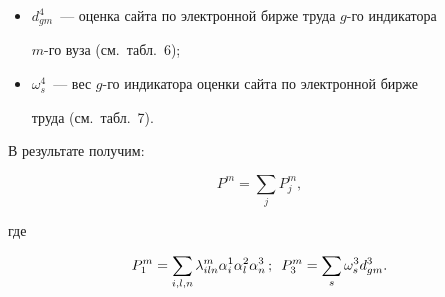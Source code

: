 \begin{itemize}
$\omega_s^3$~--- вес $s$-го индикатора оценки сайта по электронной торговой 


площадке (см.\ табл.~6); 


  \item


$d^4_{gm}$~--- оценка сайта по электронной бирже труда $g$-го индикатора 


$m$-го вуза (см.\ табл.~6); 


  \item


$\omega^4_s$~--- вес $g$-го индикатора оценки сайта по электронной бирже 


труда (см.\ табл.~7). 


  \end{itemize}





  В результате получим: 


  


  \vspace*{-2pt}


  


  \noindent


$$


P^m=\sum\limits_j P_j^m,


$$





\vspace*{-6pt}





\noindent


где 





\noindent


$$


P_1^m =\sum\limits_{i,l,n} \lambda^m_{iln} 


\alpha_i^1\alpha_l^2\alpha_n^3\,;\enskip


P^m_3= \sum\limits_s \omega_s^3 d^3_{gm}.


$$





